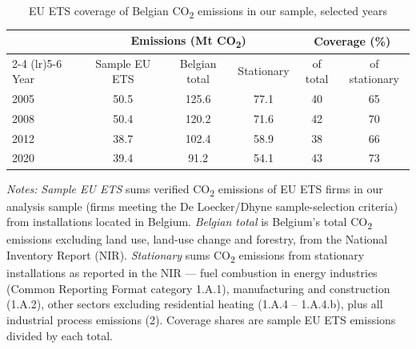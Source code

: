 \begin{table}[h]
    \centering
    \caption{EU ETS coverage of Belgian CO\textsubscript{2} emissions in our sample, selected years}
    \label{tab:ets_coverage_belgium}
    \small
    \begin{tabular}{l c c c c c}
        \toprule
         & \multicolumn{3}{c}{Emissions (Mt CO\textsubscript{2})} & \multicolumn{2}{c}{Coverage (\%)} \\
        \cmidrule(lr){2-4} \cmidrule(lr){5-6}
        Year & Sample EU ETS & Belgian total & Stationary & of total & of stationary \\
        \midrule
        2005 & 50.5 & 125.6 & 77.1 & 40 & 65 \\
        2008 & 50.4 & 120.2 & 71.6 & 42 & 70 \\
        2012 & 38.7 & 102.4 & 58.9 & 38 & 66 \\
        2020 & 39.4 & 91.2 & 54.1 & 43 & 73 \\
        \bottomrule
    \end{tabular}
    \begin{minipage}{\textwidth}
        {\footnotesize \vspace{0.25cm} \noindent \textit{Notes:} \emph{Sample EU ETS} sums verified CO\textsubscript{2} emissions of EU ETS firms in our analysis sample (firms meeting the De Loecker/Dhyne sample-selection criteria) from installations located in Belgium. \emph{Belgian total} is Belgium's total CO\textsubscript{2} emissions excluding land use, land-use change and forestry, from the National Inventory Report (NIR). \emph{Stationary} sums CO\textsubscript{2} emissions from stationary installations as reported in the NIR --- fuel combustion in energy industries (Common Reporting Format category 1.A.1), manufacturing and construction (1.A.2), other sectors excluding residential heating (1.A.4 -- 1.A.4.b), plus all industrial process emissions (2). Coverage shares are sample EU ETS emissions divided by each total.}
    \end{minipage}
\end{table}
